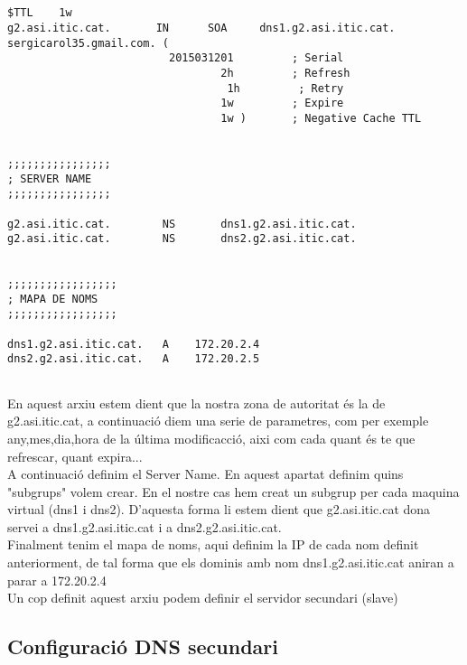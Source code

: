 \documentclass[11p]{article}
\begin{document}
\begin{lstlisting}
	

$TTL    1w
g2.asi.itic.cat.       IN      SOA     dns1.g2.asi.itic.cat. sergicarol35.gmail.com. (
                         2015031201         ; Serial
                                 2h         ; Refresh
                         	      1h         ; Retry
                                 1w         ; Expire
                                 1w )       ; Negative Cache TTL


;;;;;;;;;;;;;;;;
; SERVER NAME
;;;;;;;;;;;;;;;;

g2.asi.itic.cat.        NS       dns1.g2.asi.itic.cat.
g2.asi.itic.cat.        NS       dns2.g2.asi.itic.cat.


;;;;;;;;;;;;;;;;;
; MAPA DE NOMS
;;;;;;;;;;;;;;;;;

dns1.g2.asi.itic.cat.	A    172.20.2.4
dns2.g2.asi.itic.cat.   A    172.20.2.5


\end{lstlisting}

En aquest arxiu estem dient que la nostra zona de autoritat és la de g2.asi.itic.cat, a continuació diem una serie de parametres, com per exemple any,mes,dia,hora de la última modificacció, aixi com cada quant és te que refrescar, quant expira...\\

A continuació definim el Server Name. En aquest apartat definim quins "subgrups" volem crear. En el nostre cas hem creat un subgrup per cada maquina virtual (dns1 i dns2). D'aquesta forma li estem dient que g2.asi.itic.cat dona servei a dns1.g2.asi.itic.cat i a dns2.g2.asi.itic.cat. \\

Finalment tenim el mapa de noms, aqui definim la IP de cada nom definit anteriorment, de tal forma que els dominis amb nom dns1.g2.asi.itic.cat aniran a parar a 172.20.2.4\\

Un cop definit aquest arxiu podem definir el servidor secundari (slave)\\

\subsection{Configuració DNS secundari}
\end{document}
